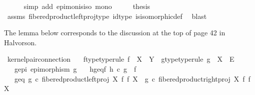 \begin{isabellebody}
\ \ \ \ \isamarkupfalse%
\ {\isacharparenleft}{\kern0pt}simp\ add{\isacharcolon}{\kern0pt}\ epi{\isacharunderscore}{\kern0pt}mon{\isacharunderscore}{\kern0pt}is{\isacharunderscore}{\kern0pt}iso\ mono{\isacharparenright}{\kern0pt}\isanewline
\ \ \isamarkupfalse%
\ \isamarkupfalse%
\ {\isacharquery}{\kern0pt}thesis\isanewline
\ \ \ \ \isamarkupfalse%
\ assms\ fibered{\isacharunderscore}{\kern0pt}product{\isacharunderscore}{\kern0pt}left{\isacharunderscore}{\kern0pt}proj{\isacharunderscore}{\kern0pt}type\ id{\isacharunderscore}{\kern0pt}type\ is{\isacharunderscore}{\kern0pt}isomorphic{\isacharunderscore}{\kern0pt}def\ \isamarkupfalse%
\ blast\isanewline
{}\isamarkupfalse%
%
\endisatagproof
{\isafoldproof}%
%
\isadelimproof
%
\endisadelimproof
%
\begin{isamarkuptext}%
The lemma below corresponds to the discussion at the top of page 42 in Halvorson.%
\end{isamarkuptext}\isamarkuptrue%
\isamarkupfalse%
\ kernel{\isacharunderscore}{\kern0pt}pair{\isacharunderscore}{\kern0pt}connection{\isacharcolon}{\kern0pt}\isanewline
\ \ \ f{\isacharunderscore}{\kern0pt}type{\isacharbrackleft}{\kern0pt}type{\isacharunderscore}{\kern0pt}rule{\isacharbrackright}{\kern0pt}{\isacharcolon}{\kern0pt}\ {\isachardoublequoteopen}f\ {\isacharcolon}{\kern0pt}\ X\ {\isasymrightarrow}\ Y{\isachardoublequoteclose}\ \ g{\isacharunderscore}{\kern0pt}type{\isacharbrackleft}{\kern0pt}type{\isacharunderscore}{\kern0pt}rule{\isacharbrackright}{\kern0pt}{\isacharcolon}{\kern0pt}\ {\isachardoublequoteopen}g\ {\isacharcolon}{\kern0pt}\ X\ {\isasymrightarrow}\ E{\isachardoublequoteclose}\isanewline
\ \ \ g{\isacharunderscore}{\kern0pt}epi{\isacharcolon}{\kern0pt}\ {\isachardoublequoteopen}epimorphism\ g{\isachardoublequoteclose}\isanewline
\ \ \ h{\isacharunderscore}{\kern0pt}g{\isacharunderscore}{\kern0pt}eq{\isacharunderscore}{\kern0pt}f{\isacharcolon}{\kern0pt}\ {\isachardoublequoteopen}h\ {\isasymcirc}\isactrlsub c\ g\ {\isacharequal}{\kern0pt}\ f{\isachardoublequoteclose}\isanewline
\ \ \ g{\isacharunderscore}{\kern0pt}eq{\isacharcolon}{\kern0pt}\ {\isachardoublequoteopen}g\ {\isasymcirc}\isactrlsub c\ fibered{\isacharunderscore}{\kern0pt}product{\isacharunderscore}{\kern0pt}left{\isacharunderscore}{\kern0pt}proj\ X\ f\ f\ X\ {\isacharequal}{\kern0pt}\ g\ {\isasymcirc}\isactrlsub c\ fibered{\isacharunderscore}{\kern0pt}product{\isacharunderscore}{\kern0pt}right{\isacharunderscore}{\kern0pt}proj\ X\ f\ f\ X\ {\isachardoublequoteclose}\isanewline

\end{isabellebody}
